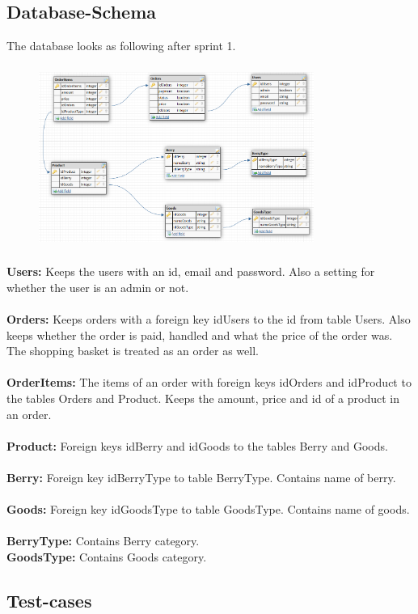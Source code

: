 \subsection{Database-Schema}
The database looks as following after sprint 1.
\begin{figure}[H]
    \center
    \includegraphics[height=6cm, width=9cm]{first_sprint/db_schema.png}
\end{figure} 

\textbf{Users:}
Keeps the users with an id, email and password. Also a setting for whether the user is an admin or
not. 
\\
\\
\textbf{Orders:}
Keeps orders with a foreign key idUsers to the id from table Users. Also keeps whether the order is
paid, handled and what the price of the order was. The shopping basket is treated as an order as
well.
\\
\\
\textbf{OrderItems:}
The items of an order with foreign keys idOrders and idProduct to the tables Orders and Product.
Keeps the amount, price and id of a product in an order.
\\
\\
\textbf{Product:}
Foreign keys idBerry and idGoods to the tables Berry and Goods.
\\
\\
\textbf{Berry:}
Foreign key idBerryType to table BerryType. Contains name of berry.
\\
\\
\textbf{Goods:}
Foreign key idGoodsType to table GoodsType. Contains name of goods.
\\
\\
\textbf{BerryType:}
Contains Berry category.
\\
\textbf{GoodsType:}
Contains Goods category.
\newpage
\subsection{Test-cases}

